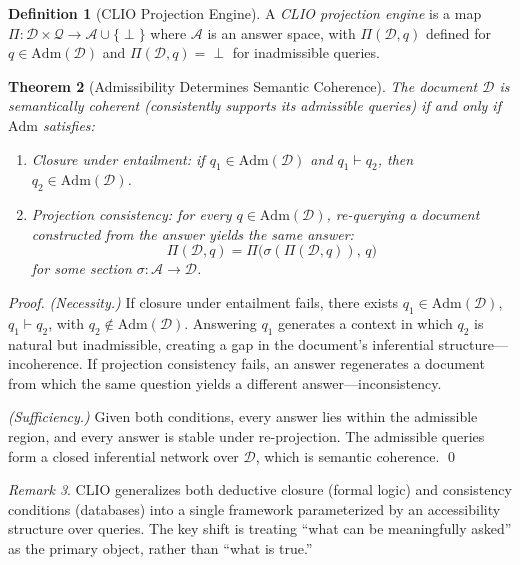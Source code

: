 \documentclass[12pt, a4paper, twoside]{article}
\theoremstyle{plain}
\newtheorem{theorem}{Theorem}[section]
\theoremstyle{definition}
\newtheorem{definition}[theorem]{Definition}
\theoremstyle{remark}
\newtheorem{remark}[theorem]{Remark}
\newcommand{\Adm}{\mathrm{Adm}}
\begin{document}
\begin{definition}[CLIO Projection Engine]
A \emph{CLIO projection engine} is a map
$\Pi: \mathcal{D} \times \mathcal{Q} \to \mathcal{A} \cup \{\perp\}$
where $\mathcal{A}$ is an answer space, with $\Pi(\mathcal{D}, q)$ defined
for $q \in \Adm(\mathcal{D})$ and $\Pi(\mathcal{D}, q) = \perp$ for inadmissible
queries.
\end{definition}

\begin{theorem}[Admissibility Determines Semantic Coherence]
\label{thm:admissibility_coherence}
The document $\mathcal{D}$ is \emph{semantically coherent} (consistently
supports its admissible queries) if and only if $\Adm$ satisfies:
\begin{enumerate}[label=(\roman*)]
  \item \emph{Closure under entailment}: if $q_1 \in \Adm(\mathcal{D})$ and
    $q_1 \vdash q_2$, then $q_2 \in \Adm(\mathcal{D})$.
  \item \emph{Projection consistency}: for every $q \in \Adm(\mathcal{D})$,
    re-querying a document constructed from the answer yields the same answer:
    \[
      \Pi(\mathcal{D}, q) = \Pi\bigl(\sigma(\Pi(\mathcal{D}, q)),\, q\bigr)
    \]
    for some section $\sigma: \mathcal{A} \to \mathcal{D}$.
\end{enumerate}
\end{theorem}

\begin{proof}
\emph{(Necessity.)} If closure under entailment fails, there exists
$q_1 \in \Adm(\mathcal{D})$, $q_1 \vdash q_2$, with $q_2 \notin \Adm(\mathcal{D})$.
Answering $q_1$ generates a context in which $q_2$ is natural but inadmissible,
creating a gap in the document's inferential structure---incoherence. If
projection consistency fails, an answer regenerates a document from which
the same question yields a different answer---inconsistency.

\emph{(Sufficiency.)} Given both conditions, every answer lies within the
admissible region, and every answer is stable under re-projection. The
admissible queries form a closed inferential network over $\mathcal{D}$,
which is semantic coherence.
\qed
\end{proof}

\begin{remark}
CLIO generalizes both deductive closure (formal logic) and consistency
conditions (databases) into a single framework parameterized by an
accessibility structure over queries. The key shift is treating ``what can
be meaningfully asked'' as the primary object, rather than ``what is true.''
\end{remark}
\end{document}
